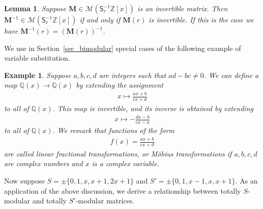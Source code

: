 \documentclass[a4paper, 11pt]{article}
\newcommand{\Z}{\mathbb{Z}}
\newcommand{\bM}{\bm{M}}
\newcommand{\indet}{x}
\newcommand{\polyring}{\Z[\indet]}
\newcommand{\polyS}{S}
\newtheorem{lemma}{Lemma}
\newtheorem{example}{Example}
\begin{document}
\begin{lemma}
\label{lemma_variable_substitution_inverse}Suppose $\bM\in\mathcal{M}(\mathsf{S}_r^{-1}\polyring)$ is an invertible matrix. Then $\bM^{-1}\in\mathcal{M}(\mathsf{S}_r^{-1}\polyring)$ if and only if $\bM(r)$ is invertible. If this is the case we have $\bM^{-1}(r)=(\bM(r))^{-1}$.
\end{lemma}
We use in Section~\ref{sec_bimodular} special cases of the following example of variable substitution.
\begin{example}
Suppose  $a,b,c,d$ are integers such that $ad-bc\neq 0$. We can define a map $\mathbb{Q}(x)\rightarrow\mathbb{Q}(x)$ by extending the assignment
\begin{align*}
x\mapsto\frac{ax+b}{cx+d}
\end{align*}
to all of $\mathbb{Q}(x)$. This map is invertible, and its inverse is obtained by extending
\begin{align*}
x\mapsto-\frac{dx-b}{cx-a}
\end{align*}
to all of $\mathbb{Q}(x)$. We remark that functions of the form
\begin{align*}
f(x)=\frac{ax+b}{cx+d}
\end{align*}
are called linear fractional transformations, or M\"obius transformations if $a,b,c,d$ are complex numbers and $x$ is a complex variable.
\end{example}
Now suppose $\polyS=\pm\{0,1,x,x+1,2x+1\}$ and $\polyS'=\pm\{0,1,x-1,x,x+1\}$. As an application of the above discussion, we derive a relationship between totally $S$-modular and totally $S'$-modular matrices. 
\end{document}
